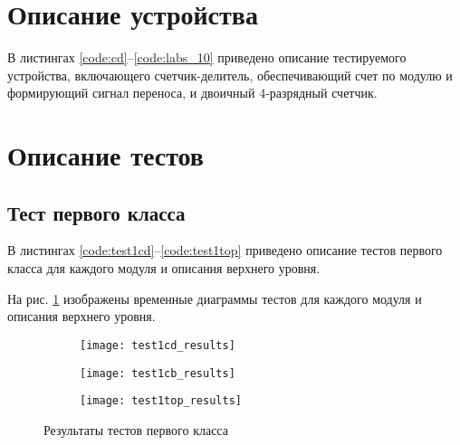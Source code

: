 \section{Описание устройства}

В листингах \ref{code:cd}--\ref{code:labs_10} приведено описание тестируемого устройства, включающего счетчик-делитель, обеспечивающий счет по модулю  и формирующий сигнал переноса, и двоичный $4$-разрядный счетчик.




\section{Описание тестов}
\label{sec:tests}

\subsection{Тест первого класса}

В листингах \ref{code:test1cd}--\ref{code:test1top} приведено описание тестов первого класса для каждого модуля и описания верхнего уровня.


\newpage


На рис. \ref{fig:test1_results} изображены временные диаграммы тестов для каждого модуля и описания верхнего уровня.
\vspace{-0.3cm}
\begin{figure}[H]
	\begin{subfigure}{\textwidth}
		\centering
		\texttt{[image: test1cd\_results]}
		\vspace{0.1cm}
	\end{subfigure}
	\begin{subfigure}{\textwidth}
		\centering
		\texttt{[image: test1cb\_results]}
		\vspace{0.1cm}
	\end{subfigure}
	\begin{subfigure}{\textwidth}
		\centering
		\texttt{[image: test1top\_results]}
	\end{subfigure}
	\caption{Результаты тестов первого класса}
	\label{fig:test1_results}
\end{figure}

